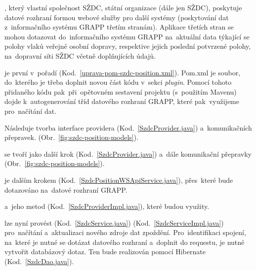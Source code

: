 

, který vlastní společnost SŽDC, státní organizace (dále jen SŽDC), poskytuje datové rozhraní formou webové služby pro další systémy (poskytování dat z~informačního systému GRAPP třetím stranám). Aplikace třetích stran se mohou dotazovat do~informačního systému GRAPP na~aktuální data týkající se polohy vlaků veřejné osobní dopravy, respektive jejich poslední potvrzené polohy, na~dopravní síti SŽDC včetně doplňujících údajů.

je první v~pořadí (Kod.~\ref{uprava-pom-szdc-position.xml}). Pom.xml je soubor, do~kterého je třeba doplnit novou část kódu v~sekci \textit{plugin}. Pomocí tohoto přidaného kódu pak~při~opětovném sestavení projektu (s~použitím Mavenu) dojde k~autogenerování tříd datového rozhraní GRAPP, které pak~využijeme pro~načítání dat.

Následuje tvorba interface providera (Kod.~\ref{SzdcProvider.java}) a~komunikačních přepravek. (Obr.~\ref{fig:szdc-position-models}).

 se tvoří jako další krok (Kod.~\ref{SzdcProvider.java}) a~dále komunikační přepravky (Obr.~\ref{fig:szdc-position-models}).
 	

 je dalším krokem (Kod.~\ref{SzdcPositionWSApiService.java}), přes~které bude dotazováno na~datové rozhraní GRAPP.


 a~jeho metod (Kod.~\ref{SzdcProviderImpl.java}), které budou využity.


 lze nyní provést (Kod.~\ref{SzdcService.java}) (Kod.~\ref{SzdcServiceImpl.java}) pro~načítání a~aktualizaci nového zdroje dat zpoždění. Pro~identifikaci spojení, na~které je nutné se dotázat datového rozhraní a~doplnit do requestu, je nutné vytvořit databázový dotaz. Ten bude realizován pomocí Hibernate (Kod.~\ref{SzdcDao.java}).


